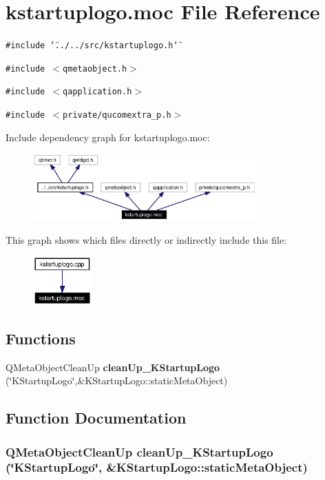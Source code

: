 \section{kstartuplogo.moc File Reference}
\label{kstartuplogo_8moc}


{\tt \#include \char`\"{}../../src/kstartuplogo.h\char`\"{}}\par
{\tt \#include $<$qmetaobject.h$>$}\par
{\tt \#include $<$qapplication.h$>$}\par
{\tt \#include $<$private/qucomextra\_\-p.h$>$}\par


Include dependency graph for kstartuplogo.moc:\begin{figure}[H]
\begin{center}
\leavevmode
\includegraphics[width=243pt]{kstartuplogo_8moc__incl}
\end{center}
\end{figure}


This graph shows which files directly or indirectly include this file:\begin{figure}[H]
\begin{center}
\leavevmode
\includegraphics[width=64pt]{kstartuplogo_8moc__dep__incl}
\end{center}
\end{figure}
\subsection*{Functions}
\begin{CompactItemize}
\item 
QMeta\-Object\-Clean\-Up {\bf clean\-Up\_\-KStartup\-Logo} (\char`\"{}KStartup\-Logo\char`\"{},\&KStartup\-Logo::static\-Meta\-Object)
\end{CompactItemize}


\subsection{Function Documentation}
\subsubsection{\setlength{\rightskip}{0pt plus 5cm}QMeta\-Object\-Clean\-Up clean\-Up\_\-KStartup\-Logo (\char`\"{}KStartup\-Logo\char`\"{}, \&KStartup\-Logo::static\-Meta\-Object)\hspace{0.3cm}{\tt  [static]}}\label{kstartuplogo_8moc_a0}


